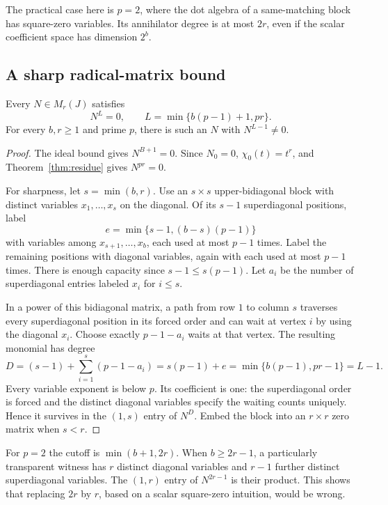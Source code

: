 The practical case here is $p=2$, where the dot algebra of a same-matching
block has square-zero variables. Its annihilator degree is at most $2r$,
even if the scalar coefficient space has dimension $2^b$.

\subsection{A sharp radical-matrix bound}

\begin{theorem}\label{thm:radical}
Every $N\in M_r(J)$ satisfies
\[
 N^L=0,\qquad L=\min\{b(p-1)+1,pr\}.
\]
For every $b,r\ge1$ and prime $p$, there is such an $N$ with
$N^{L-1}\ne0$.
\end{theorem}
\begin{proof}
The ideal bound gives $N^{B+1}=0$. Since $N_0=0$,
$\chi_0(t)=t^r$, and Theorem~\ref{thm:residue} gives $N^{pr}=0$.

For sharpness, let $s=\min(b,r)$. Use an $s\times s$ upper-bidiagonal block
with distinct variables $x_1,\ldots,x_s$ on the diagonal. Of its $s-1$
superdiagonal positions, label
\[
 e=\min\{s-1,(b-s)(p-1)\}
\]
with variables among $x_{s+1},\ldots,x_b$, each used at most $p-1$ times.
Label the remaining positions with diagonal variables, again with each
used at most $p-1$ times. There is enough capacity since
$s-1\le s(p-1)$. Let $a_i$ be the number of superdiagonal entries labeled
$x_i$ for $i\le s$.

In a power of this bidiagonal matrix, a path from row $1$ to column $s$
traverses every superdiagonal position in its forced order and can wait
at vertex $i$ by using the diagonal $x_i$. Choose exactly $p-1-a_i$ waits
at that vertex. The resulting monomial has degree
\[
 D=(s-1)+\sum_{i=1}^s(p-1-a_i)
  =s(p-1)+e
  =\min\{b(p-1),pr-1\}=L-1.
\]
Every variable exponent is below $p$. Its coefficient is one: the
superdiagonal order is forced and the distinct diagonal variables specify
the waiting counts uniquely. Hence it survives in the $(1,s)$ entry of
$N^D$. Embed the block into an $r\times r$ zero matrix when $s<r$.
\end{proof}

For $p=2$ the cutoff is $\min(b+1,2r)$.
When $b\ge2r-1$, a particularly transparent witness has $r$ distinct
diagonal variables and $r-1$ further distinct superdiagonal variables.
The $(1,r)$ entry of $N^{2r-1}$ is their product.
This shows that replacing $2r$ by $r$, based on a scalar square-zero
intuition, would be wrong.

